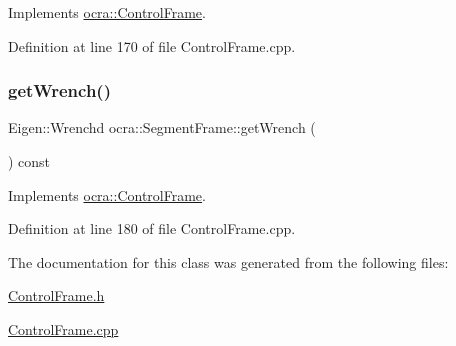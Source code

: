 Implements \hyperlink{classocra_1_1ControlFrame_a398df839f75886867c86a8e70ac9bf24}{ocra\+::\+Control\+Frame}.



Definition at line 170 of file Control\+Frame.\+cpp.

\hypertarget{classocra_1_1SegmentFrame_a47bebcb9817083395ab034fe8fb72a19}{}\label{classocra_1_1SegmentFrame_a47bebcb9817083395ab034fe8fb72a19} 
\subsubsection{\texorpdfstring{get\+Wrench()}{getWrench()}}
{\footnotesize\ttfamily Eigen\+::\+Wrenchd ocra\+::\+Segment\+Frame\+::get\+Wrench (\begin{DoxyParamCaption}{ }\end{DoxyParamCaption}) const\hspace{0.3cm}{\ttfamily [virtual]}}



Implements \hyperlink{classocra_1_1ControlFrame_a069aaf1eab98598fbffee263fcde0c56}{ocra\+::\+Control\+Frame}.



Definition at line 180 of file Control\+Frame.\+cpp.



The documentation for this class was generated from the following files\+:\begin{DoxyCompactItemize}
\item 
\hyperlink{ControlFrame_8h}{Control\+Frame.\+h}\item 
\hyperlink{ControlFrame_8cpp}{Control\+Frame.\+cpp}\end{DoxyCompactItemize}

